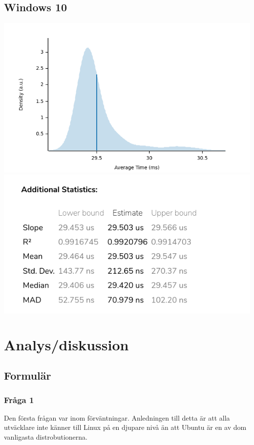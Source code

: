 \documentclass[12pt, a4paper]{report}
\begin{document}
   \subsection{Windows 10}
   \includegraphics[width=1\textwidth]{bench_windows_average_time}
   \includegraphics[width=1\textwidth]{add_stats_windows}


\section{Analys/diskussion}

\subsection{Formulär}

\subsubsection{Fråga 1}
Den första frågan var inom förväntningar. Anledningen till detta är att alla utväcklare inte känner till Linux på en djupare nivå än att Ubuntu är en av dom vanligasta distrobutionerna\cite{commondistro}.
\end{document}
